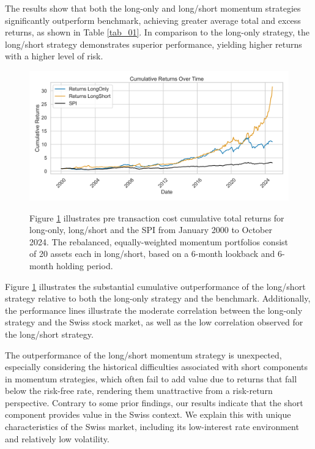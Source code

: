 \documentclass[a4paper,12pt]{article}
\begin{document}
The results show that both the long-only and long/short momentum strategies significantly outperform benchmark, achieving greater average total and excess returns, as shown in Table \ref{tab_01}. In comparison to the long-only strategy, the long/short strategy demonstrates superior performance, yielding higher returns with a higher level of risk. 

\begin{figure}[htbp]
\centerline{\includegraphics[width=1\textwidth]{figures/cumulative_returns.png}}
\caption{}
\label{fig_01}
\justifying
\small{{Figure \ref{fig_01} illustrates pre transaction cost cumulative total returns for long-only, long/short and the SPI from January 2000 to October 2024. The rebalanced, equally-weighted momentum portfolios consist of 20 assets each in long/short, based on a 6-month lookback  and 6-month holding period.}}
\end{figure}

Figure \ref{fig_01} illustrates the substantial cumulative outperformance of the long/short strategy relative to both the long-only strategy and the benchmark. Additionally, the performance lines illustrate the moderate correlation between the long-only strategy and the Swiss stock market, as well as the low correlation observed for the long/short strategy.

The outperformance of the long/short momentum strategy is unexpected, especially considering the historical difficulties associated with short components in momentum strategies, which often fail to add value due to returns that fall below the risk-free rate, rendering them unattractive from a risk-return perspective. Contrary to some prior findings, our results indicate that the short component provides value in the Swiss context. We explain this with unique characteristics of the Swiss market, including its low-interest rate environment and relatively low volatility.
\end{document}
